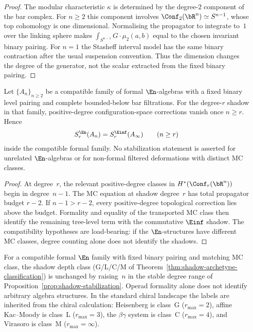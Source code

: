 \begin{proof}
The modular characteristic $\kappa$ is determined by the degree-$2$
component of the bar complex. For $n\geq2$ this component involves
$\Conf_2(\bR^n)\simeq S^{n-1}$, whose top cohomology is one
dimensional. Normalising the propagator to integrate to~$1$ over the
linking sphere makes
$\int_{S^{n-1}}G\cdot\mu_2(a,b)$ equal to the chosen invariant
binary pairing. For $n=1$ the Stasheff interval model has the same
binary contraction after the usual suspension convention. Thus the
dimension changes the degree of the generator, not the scalar
extracted from the fixed binary pairing.
\end{proof}

\begin{proposition}
\label{prop:shadow-stabilization}
Let $\{A_n\}_{n\geq2}$ be a compatible family of formal
$\En$-algebras with a fixed binary level pairing and complete
bounded-below bar filtrations. For the degree-$r$ shadow in that
family, positive-degree configuration-space corrections vanish once
$n \geq r$. Hence
\[
S_r^{\En}(A_n)=S_r^{\Einf}(A_\infty)
\qquad (n\geq r)
\]
inside the compatible formal family. No stabilization statement is
asserted for unrelated $\En$-algebras or for non-formal filtered
deformations with distinct MC classes.
\end{proposition}

\begin{proof}
At degree~$r$, the relevant positive-degree classes in
$H^*(\Conf_r(\bR^n))$ begin in degree~$n{-}1$. The MC equation at
shadow degree~$r$ has total propagator budget $r{-}2$. If
$n{-}1>r{-}2$, every positive-degree topological correction lies
above the budget. Formality and equality of the transported MC class
then identify the remaining tree-level term with the commutative
$\Einf$ shadow. The compatibility hypotheses are load-bearing: if
the $\En$-structures have different MC classes, degree counting alone
does not identify the shadows.
\end{proof}

\begin{remark}
\label{rem:glcm-en}
For a compatible formal $\En$ family with fixed binary pairing and
matching MC class, the shadow depth class (G/L/C/M of
Theorem~\ref{thm:shadow-archetype-classification}) is unchanged by
raising~$n$ in the stable degree range of
Proposition~\ref{prop:shadow-stabilization}. Operad formality alone
does not identify arbitrary algebra structures. In the standard
chiral landscape the labels are inherited from the chiral
calculation: Heisenberg is class~G ($r_{\max}=2$), affine Kac--Moody
is class~L ($r_{\max}=3$), the $\beta\gamma$ system is class~C
($r_{\max}=4$), and Virasoro is class~M
($r_{\max}=\infty$).
\end{remark}

